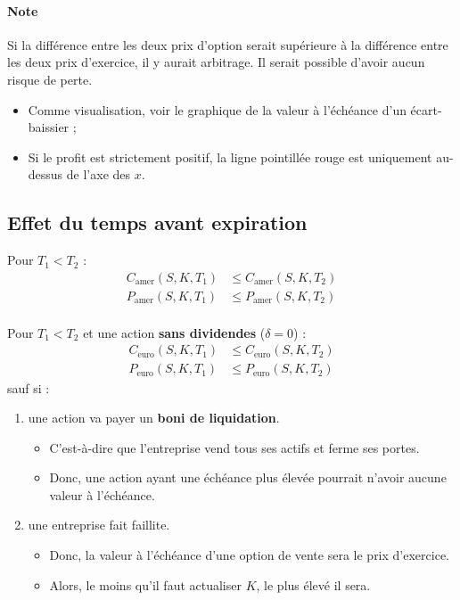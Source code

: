 \documentclass[10pt, french]{article}
\begin{document}
\begin{multicols*}{2}
\paragraph{Note}	Si la différence entre les deux prix d'option serait supérieure à la différence entre les deux prix d'exercice, il y aurait arbitrage. Il serait possible d'avoir aucun risque de perte.
\begin{itemize}
	\item	Comme visualisation, voir le graphique de la valeur à l'échéance d'un écart-baissier ;
	\item	Si le profit est strictement positif, la ligne pointillée rouge est uniquement au-dessus de l'axe des $x$.
\end{itemize}


\columnbreak
\subsection{Effet du temps avant expiration}
Pour $T_{1}	<	T_{2}$ :
\begin{align*}
	C_{\text{amer}}(S, K, T_{1})	&\leq	C_{\text{amer}}(S, K, T_{2})	\\
	P_{\text{amer}}(S, K, T_{1})	&\leq	P_{\text{amer}}(S, K, T_{2})	\\
\end{align*}

Pour $T_{1}	<	T_{2}$ et une action \textbf{sans dividendes} ($\delta	=	0$) : 
\begin{align*}
	C_{\text{euro}}(S, K, T_{1})	&\leq	C_{\text{euro}}(S, K, T_{2})	\\
	P_{\text{euro}}(S, K, T_{1})	&\leq	P_{\text{euro}}(S, K, T_{2})
\end{align*}
sauf si :
\begin{enumerate}
	\item	une action va payer un \textbf{boni de liquidation}.
		\begin{itemize}
		\item	C'est-à-dire que l'entreprise vend tous ses actifs et ferme ses portes.
		\item	Donc, une action ayant une échéance plus élevée pourrait n'avoir aucune valeur à l'échéance.
		\end{itemize}
	\item	une entreprise fait faillite.
		\begin{itemize}
		\item	Donc, la valeur à l'échéance d'une option de vente sera le prix d'exercice.
		\item	Alors, le moins qu'il faut actualiser $K$, le plus élevé il sera.
		\end{itemize}
\end{enumerate}



\end{multicols*}
\end{document}
